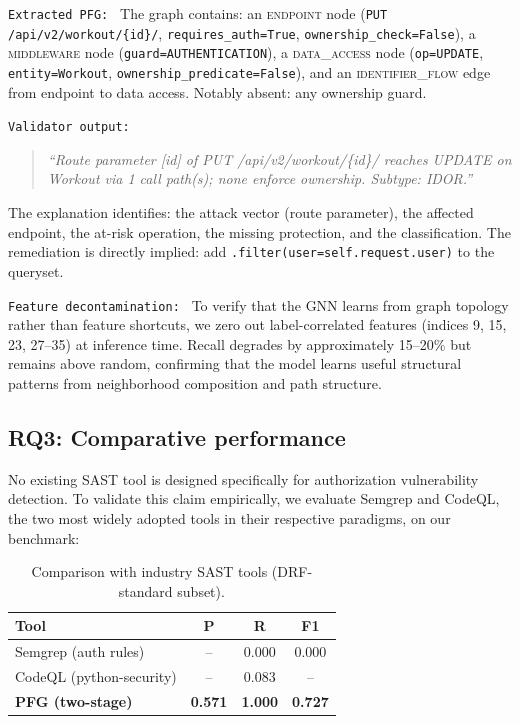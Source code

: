 \texttt{Extracted PFG: } The graph contains: an \textsc{endpoint} node (\texttt{PUT
/api/v2/workout/\{id\}/}, \texttt{requires\_auth=True},
\texttt{ownership\_check=False}), a \textsc{middleware} node
(\texttt{guard=AUTHENTICATION}), a \textsc{data\_access} node
(\texttt{op=UPDATE}, \texttt{entity=Workout},
\texttt{ownership\_predicate=False}), and an \textsc{identifier\_flow} edge
from endpoint to data access. Notably absent: any ownership guard.

\texttt{Validator output: }
\begin{quote}
\emph{``Route parameter [id] of PUT /api/v2/workout/\{id\}/ reaches UPDATE
on Workout via 1 call path(s); none enforce ownership. Subtype: IDOR.''}
\end{quote}
The explanation identifies: the attack vector (route parameter), the affected
endpoint, the at-risk operation, the missing protection, and the
classification. The remediation is directly implied: add
\texttt{.filter(user=self.request.user)} to the queryset.

\texttt{Feature decontamination: }
To verify that the GNN learns from graph topology rather than feature
shortcuts, we zero out label-correlated features (indices 9, 15, 23, 27--35)
at inference time. Recall degrades by approximately 15--20\% but remains
above random, confirming that the model learns useful structural patterns
from neighborhood composition and path structure.

\subsection{RQ3: Comparative performance}
\label{sec:det-rq3}


No existing SAST tool is designed specifically for authorization
vulnerability detection. To validate this claim empirically, we evaluate
Semgrep and CodeQL, the two most widely adopted tools in their respective
paradigms, on our benchmark:

\begin{table}[htbp]
\centering
\caption{Comparison with industry SAST tools (DRF-standard subset).}
\label{tab:det-sast}
\begin{tabular}{@{}lccc@{}}
\toprule
\textbf{Tool} & \textbf{P} & \textbf{R} & \textbf{F1} \\
\midrule
Semgrep (auth rules) & -- & 0.000 & 0.000 \\
CodeQL (python-security) & -- & 0.083 & -- \\
\textbf{PFG (two-stage)} & \textbf{0.571} & \textbf{1.000}
& \textbf{0.727} \\
\bottomrule
\end{tabular}
\end{table}

